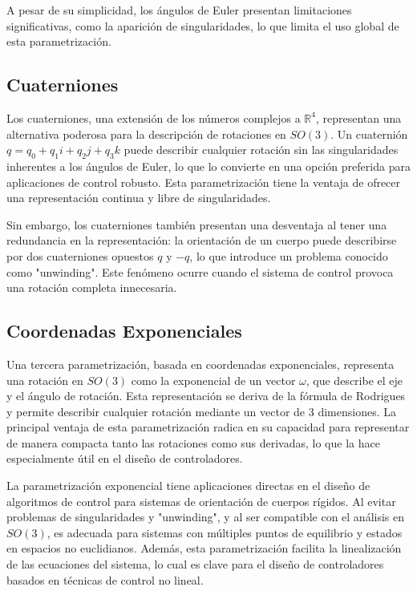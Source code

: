 \documentclass[conference]{IEEEtran}
\begin{document}
A pesar de su simplicidad, los ángulos de Euler presentan limitaciones significativas, como la aparición de singularidades, lo que limita el uso global de esta parametrización.

\subsection{Cuaterniones}
Los cuaterniones, una extensión de los números complejos a \( \mathbb{R}^4 \), representan una alternativa poderosa para la descripción de rotaciones en \( SO(3) \). Un cuaternión \( q = q_0 + q_1 i + q_2 j + q_3 k \) puede describir cualquier rotación sin las singularidades inherentes a los ángulos de Euler, lo que lo convierte en una opción preferida para aplicaciones de control robusto. Esta parametrización tiene la ventaja de ofrecer una representación continua y libre de singularidades.

Sin embargo, los cuaterniones también presentan una desventaja al tener una redundancia en la representación: la orientación de un cuerpo puede describirse por dos cuaterniones opuestos \( q \) y \( -q \), lo que introduce un problema conocido como "unwinding". Este fenómeno ocurre cuando el sistema de control provoca una rotación completa innecesaria.

\subsection{Coordenadas Exponenciales}
Una tercera parametrización, basada en coordenadas exponenciales, representa una rotación en \( SO(3) \) como la exponencial de un vector \( \omega \), que describe el eje y el ángulo de rotación. Esta representación se deriva de la fórmula de Rodrigues y permite describir cualquier rotación mediante un vector de 3 dimensiones. La principal ventaja de esta parametrización radica en su capacidad para representar de manera compacta tanto las rotaciones como sus derivadas, lo que la hace especialmente útil en el diseño de controladores.

La parametrización exponencial tiene aplicaciones directas en el diseño de algoritmos de control para sistemas de orientación de cuerpos rígidos. Al evitar problemas de singularidades y "unwinding", y al ser compatible con el análisis en \( SO(3) \), es adecuada para sistemas con múltiples puntos de equilibrio y estados en espacios no euclidianos. Además, esta parametrización facilita la linealización de las ecuaciones del sistema, lo cual es clave para el diseño de controladores basados en técnicas de control no lineal.
\end{document}
